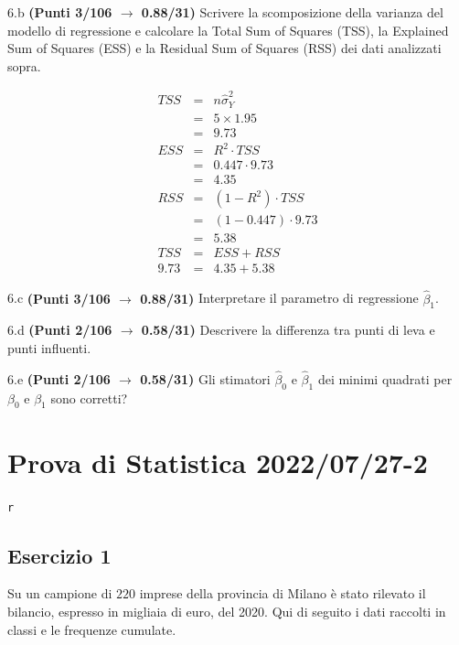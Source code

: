 \documentclass[
  11pt,
]{book}
\theoremstyle{mytheoremstyle}
\theoremstyle{mydefstyle}
\newenvironment{sol}
  {
  \begin{tcolorbox}[enhanced,breakable,arc=0.1mm,boxrule=1pt,colback=white,colframe=iblue,
  title=\bf \fontfamily{lmss}\selectfont \hspace{.5 cm} Soluzione,drop fuzzy shadow]

}{
\end{tcolorbox}
  }
\begin{document}
6.b \textbf{(Punti 3/106 \(\rightarrow\) 0.88/31)} Scrivere la scomposizione della varianza del modello di regressione
e calcolare la Total Sum of Squares (TSS), la Explained Sum of Squares (ESS) e la Residual Sum of Squares (RSS) dei dati analizzati sopra.

\begin{sol}
\begin{eqnarray*}
   TSS &=& n\hat\sigma^2_Y\\
      &=& 5 \times 1.95 \\
      &=&  9.73 \\
   ESS &=& R^2\cdot TSS\\
      &=&  0.447 \cdot 9.73 \\
      &=& 4.35 \\
   RSS &=& (1-R^2)\cdot TSS\\
      &=& (1- 0.447 )\cdot 9.73 \\
      &=&  5.38 \\
   TSS &=& ESS+RSS \\ 9.73  &=&  4.35 + 5.38 
  \end{eqnarray*}

\end{sol}

6.c \textbf{(Punti 3/106 \(\rightarrow\) 0.88/31)} Interpretare il parametro di regressione \(\hat\beta_1\).

6.d \textbf{(Punti 2/106 \(\rightarrow\) 0.58/31)} Descrivere la differenza tra punti di leva e punti influenti.

6.e \textbf{(Punti 2/106 \(\rightarrow\) 0.58/31)} Gli stimatori \(\hat\beta_0\) e \(\hat\beta_1\) dei minimi
quadrati per \(\beta_0\) e \(\beta_1\) sono corretti?

\section{Prova di Statistica 2022/07/27-2}\label{prova-di-statistica-20220727-2}

\texttt{r}

\subsection{Esercizio 1}\label{esercizio-1-17}

Su un campione di \(220\) imprese della provincia di Milano è stato
rilevato il bilancio, espresso in migliaia di euro, del 2020. Qui di seguito i dati raccolti in classi
e le frequenze cumulate.
\end{document}

